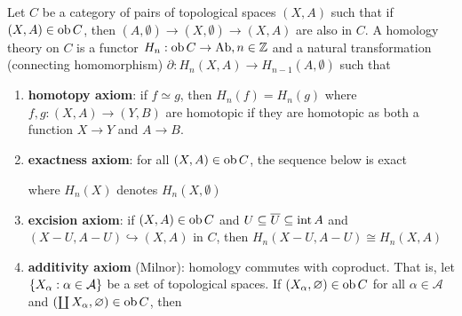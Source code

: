 \documentclass{report}
\begin{document}
\begin{axiom}
    Let $C$ be a category of pairs of topological spaces $(X, A)$ such that if $(X, A) \in \ob C$, then $(A, \emptyset) \to (X, \emptyset) \to (X, A)$ are also in $C$. A homology theory on $C$ is a functor $H_n: \ob C \to \Ab, n \in \Z$ and a natural transformation (connecting homomorphism) $\partial: H_n(X, A) \to H_{n-1}(A, \emptyset)$ such that
    \begin{enumerate}
        \item \textbf{homotopy axiom}: if $f \simeq g$, then $H_n(f) = H_n(g)$ where $f, g: (X, A) \to (Y, B)$ are homotopic if they are homotopic as both a function $X \to Y$ and $A \to B$.
        \item \textbf{exactness axiom}: for all $(X, A) \in \ob C$, the sequence below is exact
        \begin{center}
        \end{center}
        where $H_n(X)$ denotes $H_n(X, \emptyset)$
        
        \item \textbf{excision axiom}: if $(X, A) \in \ob C$ and $U \subseteq \overline{U} \subseteq \interior A$ and $(X - U, A - U) \hookrightarrow (X, A)$ in $C$, then $H_n(X - U, A - U) \cong H_n(X, A)$

        \item \textbf{additivity axiom} (Milnor): homology commutes with coproduct. That is, let $\set{X_\alpha: \alpha \in \mathcal{A}}$ be a set of topological spaces. If $(X_\alpha, \emptyset) \in \ob C$ for all $\alpha \in \mathcal{A}$ and $\tuple*{\coprod X_\alpha, \emptyset} \in \ob C$, then

        \begin{center}
        \end{center}


\end{enumerate}
\end{axiom}
\end{document}
